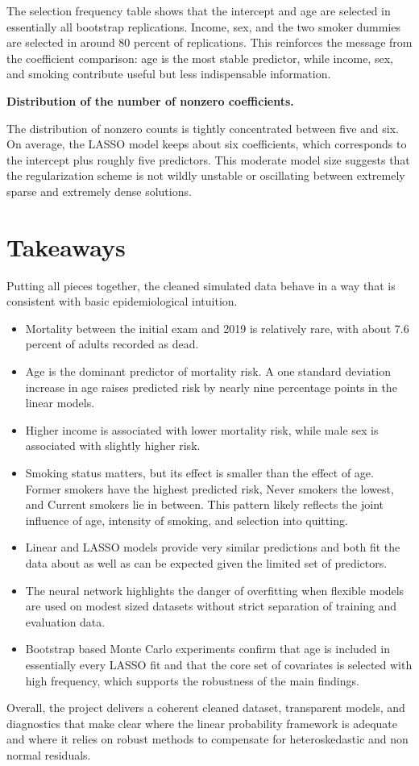 \documentclass{article}
\begin{document}
The selection frequency table shows that the intercept and age are selected in essentially all bootstrap replications. Income, sex, and the two smoker dummies are selected in around 80 percent of replications. This reinforces the message from the coefficient comparison: age is the most stable predictor, while income, sex, and smoking contribute useful but less indispensable information.

\medskip
\noindent\textbf{Distribution of the number of nonzero coefficients.}
\par


The distribution of nonzero counts is tightly concentrated between five and six. On average, the LASSO model keeps about six coefficients, which corresponds to the intercept plus roughly five predictors. This moderate model size suggests that the regularization scheme is not wildly unstable or oscillating between extremely sparse and extremely dense solutions.

\section{Takeaways}

Putting all pieces together, the cleaned simulated data behave in a way that is consistent with basic epidemiological intuition.

\begin{itemize}
  \item Mortality between the initial exam and 2019 is relatively rare, with about 7.6 percent of adults recorded as dead.
  \item Age is the dominant predictor of mortality risk. A one standard deviation increase in age raises predicted risk by nearly nine percentage points in the linear models.
  \item Higher income is associated with lower mortality risk, while male sex is associated with slightly higher risk.
  \item Smoking status matters, but its effect is smaller than the effect of age. Former smokers have the highest predicted risk, Never smokers the lowest, and Current smokers lie in between. This pattern likely reflects the joint influence of age, intensity of smoking, and selection into quitting.
  \item Linear and LASSO models provide very similar predictions and both fit the data about as well as can be expected given the limited set of predictors.
  \item The neural network highlights the danger of overfitting when flexible models are used on modest sized datasets without strict separation of training and evaluation data.
  \item Bootstrap based Monte Carlo experiments confirm that age is included in essentially every LASSO fit and that the core set of covariates is selected with high frequency, which supports the robustness of the main findings.
\end{itemize}

Overall, the project delivers a coherent cleaned dataset, transparent models, and diagnostics that make clear where the linear probability framework is adequate and where it relies on robust methods to compensate for heteroskedastic and non normal residuals.
\end{document}
